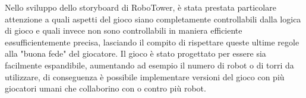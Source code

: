 Nello sviluppo dello storyboard di RoboTower, è stata prestata particolare attenzione a quali aspetti del gioco siano completamente controllabili dalla logica di gioco e quali invece non sono controllabili in maniera efficiente e\o sufficientemente precisa, lasciando il compito di rispettare queste ultime regole alla "buona fede" del giocatore. Il gioco è stato progettato per essere sia facilmente espandibile, aumentando ad esempio il numero di robot o di torri da utilizzare, di conseguenza è possibile implementare versioni del gioco con più giocatori umani che collaborino con o contro più robot.
